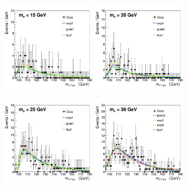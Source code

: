 \begin{figure}[htbp]
\begin{center}
		\includegraphics[width=0.42\textwidth]{figures/chapter04/bkg_fTest/allPdfs_cat0_15.png}
		\includegraphics[width=0.42\textwidth]{figures/chapter04/bkg_fTest/allPdfs_cat0_20.png}\\
    \label{fig:bkg_fTest2}
\end{center}
\end{figure}

\begin{figure}[htbp]
  \begin{center}
		\includegraphics[width=0.42\textwidth]{figures/chapter04/bkg_fTest/allPdfs_cat0_25.png}
        \includegraphics[width=0.42\textwidth]{figures/chapter04/bkg_fTest/allPdfs_cat0_30.png} \\
    \label{fig:bkg_fTest3}
\end{center}
\end{figure}

